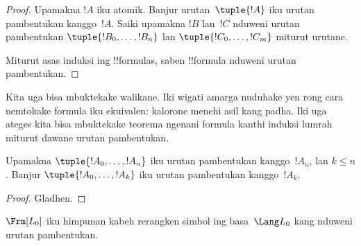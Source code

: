 \documentclass[../../../include/open-logic-section]{subfiles}
\begin{document}
\begin{proof}
Upamakna $!A$ iku atomik. Banjur urutan~$\tuple{!A}$ iku urutan
pambentukan kanggo~$!A$.
%
Saiki upamakna $!B$ lan~$!C$ nduweni urutan pambentukan
$\tuple{!B_0,\dotsc,!B_n}$ lan $\tuple{!C_0,\dotsc,!C_m}$
miturut urutane.
%
\begin{enumerate}
\end{enumerate}
Miturut asas induksi ing !!{formula}s, saben !!{formula} nduweni urutan
pambentukan.
\end{proof}

Kita uga bisa mbuktekake walikane. Iki wigati amarga nuduhake yen rong
cara nemtokake formula iku ekuivalen: kalorone menehi asil kang padha.
Iki uga ateges kita bisa mbuktekake teorema ngenani formula kanthi
induksi lumrah miturut dawane urutan pambentukan.

\begin{lem}
Upamakna $\tuple{!A_0,\dotsc,!A_n}$ iku urutan pambentukan kanggo~$!A_n$,
lan $k \leq n$. Banjur $\tuple{!A_0,\dotsc,!A_k}$ iku urutan
pambentukan kanggo~$!A_k$.
\end{lem}

\begin{proof}
Gladhen.
\end{proof}

\begin{thm}
$\Frm[L_0]$ iku himpunan kabeh rerangken simbol ing basa~$\Lang L_0$
kang nduweni urutan pambentukan.
\end{thm}
\end{document}
